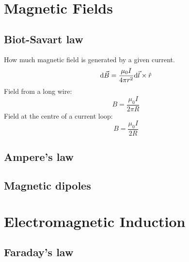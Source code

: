 \section{Magnetic Fields}
\subsection*{Biot-Savart law}
How much magnetic field is generated by a given current.
\begin{equation*}
    \differential \vec{B} = \frac{\mu_0 I}{4 \pi r^2} \differential \vec{l} \times \hat{r}
\end{equation*}
Field from a long wire:
\begin{equation*}
    B = \frac{\mu_0 I}{2\pi R}
\end{equation*}
Field at the centre of a current loop:
\begin{equation*}
    B = \frac{\mu_0 I}{2R}
\end{equation*}

\subsection*{Ampere's law}

\subsection*{Magnetic dipoles}

\section{Electromagnetic Induction}

\subsection*{Faraday's law}
